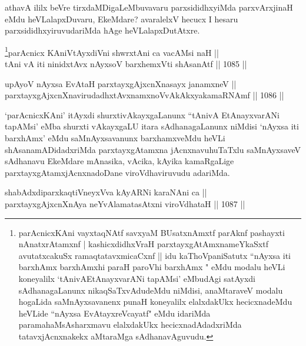 \begin{artha}
athavA ililx beVre tirxdaMDigaLeMbuvavaru parxsididhxyiMda parxvArxjinaH eMdu heVLalapxDuvaru, EkeMdare? avaralelxV hecucx I hesaru parxsididhxyiruvudariMda hAge heVLalapxDutAtxre.
\end{artha}



\begin{shl}
\footnote{parAcnicxKAni vayxtaqNAtf savxyaM BUsatxnAmxtf parAknf pashayxti nAnatxrAtamxnf | kashicxdidhxVraH parxtayxgAtAmxnameYkaSxtf avutatxcakuSx ramaqtatavxmicaCxnf ||  idu kaThoVpaniSatutx ``nAyxsa iti barxhAmx barxhAmxhi paraH paroVhi barxhAmx " eMdu modalu heVLi koneyalilx `tAnivAEtAnayxvarANi tapAMsi' eMbudAgi satAyxdi sAdhanagaLanunx nikaqSaTxvAdudeMdu niMdisi, anaMtaraveV modalu hogaLida saMnAyxsavanenx punaH koneyalilx elalxdakUkx hecicxnadeMdu heVLide ``nAyxsa EvAtayxreVcayatf" eMdu idariMda paramahaMsAsharxmavu elalxdakUkx hecicxnadAdadxriMda tatavxjAcnxnakekx aMtaraMga sAdhanavAguvudu.}parAcnicx KAniVtAyxdiVni shwrxtAni ca vacAMsi naH || \\
tAni vA iti ninidxtAvx nAyxsoV barxhemxVti shAsanAtf \hfill || 1085 ||  
\end{shl}
				
\begin{shl}
upAyoV nAyxsa EvAtaH parxtayxgAjxcnXnasayx janamxneV || \\
parxtayxgAjxcnXnavirudadhxtAvxnamxnoVvAkAkxyakamaRNAmf \hfill || 1086 ||  
\end{shl}

\begin{artha}
`parAcnicxKAni' itAyxdi shurxtivAkayxgaLanunx ``tAnivA EtAnayxvarANi tapAMsi' eMba shurxti vAkayxgaLU itara sAdhanagaLanunx niMdisi `nAyxsa iti barxhAmx' eMdu saMnAyxsavanunx barxhamxveMdu heVLi shAsanamADidadxriMda parxtayxgAtamxna jAcnxnavuhuTaTxlu saMnAyxsaveV sAdhanavu EkeMdare mAnasika, vAcika, kAyika kamaRgaLige parxtayxgAtamxjAcnxnadoDane viroVdhaviruvudu adariMda.
\end{artha}


\begin{shl}
shabAdxdiparxkaqtiVneyxVva kAyARNi karaNAni ca || \\
parxtayxgAjxcnXnAya neYvAlamatasAtxni viroVdhataH \hfill || 1087 ||  
\end{shl}	

